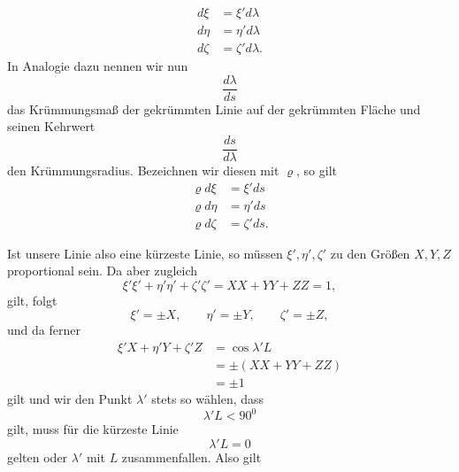 %
\[
\begin{aligned}
d\xi&=\xi'd\lambda\\
d\eta&=\eta'd\lambda\\
d\zeta&=\zeta'd\lambda.
\end{aligned}
\]
In Analogie dazu nennen wir nun
\[
\frac{d\lambda}{ds}
\]
das Krümmungsmaß der gekrümmten Linie auf der gekrümmten Fläche und seinen Kehrwert
\[
\frac{ds}{d\lambda}
\]
den Krümmungsradius. Bezeichnen wir diesen mit $\varrho$, so gilt
\[
\begin{aligned}
\varrho d\xi&=\xi'ds\\
\varrho d\eta&=\eta'ds\\
\varrho d\zeta&=\zeta'ds.
\end{aligned}
\]

Ist unsere Linie also eine kürzeste Linie, so müssen $\xi',\eta',\zeta'$ zu den Größen $X,Y,Z$ proportional sein. Da aber zugleich
\[
\xi'\xi'+\eta'\eta'+\zeta'\zeta'=XX+YY+ZZ=1,
\]
gilt, folgt
\[
\xi'=\pm X,\qquad\eta'=\pm Y,\qquad\zeta'=\pm Z,
\]
und da ferner
\[
\begin{aligned}
\xi'X+\eta'Y+\zeta'Z&=\cos\lambda'L\\
&=\pm(XX+YY+ZZ)\\
&=\pm1
\end{aligned}
\]
gilt und wir den Punkt $\lambda'$ stets so wählen, dass
\[
\lambda'L<90^{0}
\]
gilt, muss für die kürzeste Linie
\[
\lambda'L=0
\]
gelten oder $\lambda'$ mit $L$ zusammenfallen. Also gilt

